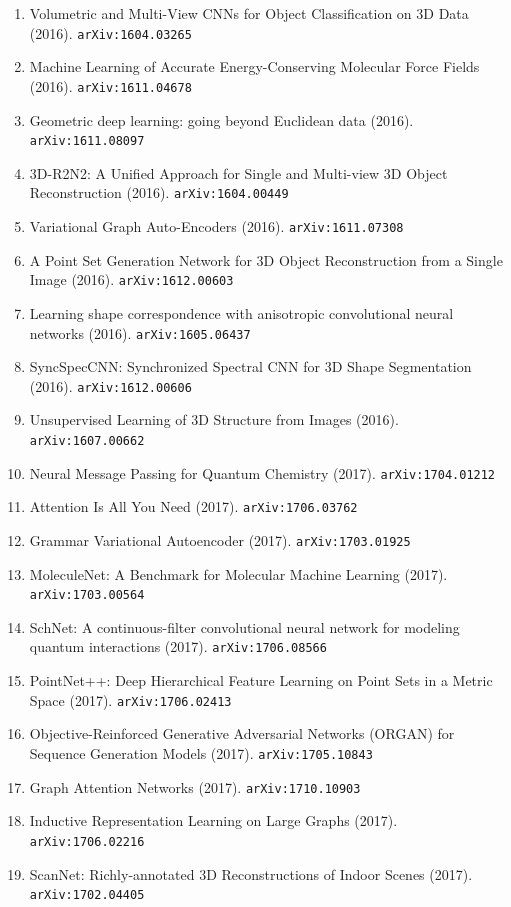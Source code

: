 \documentclass[11pt]{article}
\begin{document}
\begin{enumerate}
  \item Volumetric and Multi-View CNNs for Object Classification on 3D Data (2016). \texttt{arXiv:1604.03265}
  \item Machine Learning of Accurate Energy-Conserving Molecular Force Fields (2016). \texttt{arXiv:1611.04678}
  \item Geometric deep learning: going beyond Euclidean data (2016). \texttt{arXiv:1611.08097}
  \item 3D-R2N2: A Unified Approach for Single and Multi-view 3D Object
  Reconstruction (2016). \texttt{arXiv:1604.00449}
  \item Variational Graph Auto-Encoders (2016). \texttt{arXiv:1611.07308}
  \item A Point Set Generation Network for 3D Object Reconstruction from a
  Single Image (2016). \texttt{arXiv:1612.00603}
  \item Learning shape correspondence with anisotropic convolutional neural
  networks (2016). \texttt{arXiv:1605.06437}
  \item SyncSpecCNN: Synchronized Spectral CNN for 3D Shape Segmentation (2016). \texttt{arXiv:1612.00606}
  \item Unsupervised Learning of 3D Structure from Images (2016). \texttt{arXiv:1607.00662}
  \item Neural Message Passing for Quantum Chemistry (2017). \texttt{arXiv:1704.01212}
  \item Attention Is All You Need (2017). \texttt{arXiv:1706.03762}
  \item Grammar Variational Autoencoder (2017). \texttt{arXiv:1703.01925}
  \item MoleculeNet: A Benchmark for Molecular Machine Learning (2017). \texttt{arXiv:1703.00564}
  \item SchNet: A continuous-filter convolutional neural network for modeling
  quantum interactions (2017). \texttt{arXiv:1706.08566}
  \item PointNet++: Deep Hierarchical Feature Learning on Point Sets in a Metric
  Space (2017). \texttt{arXiv:1706.02413}
  \item Objective-Reinforced Generative Adversarial Networks (ORGAN) for
  Sequence Generation Models (2017). \texttt{arXiv:1705.10843}
  \item Graph Attention Networks (2017). \texttt{arXiv:1710.10903}
  \item Inductive Representation Learning on Large Graphs (2017). \texttt{arXiv:1706.02216}
  \item ScanNet: Richly-annotated 3D Reconstructions of Indoor Scenes (2017). \texttt{arXiv:1702.04405}

\end{enumerate}
\end{document}
